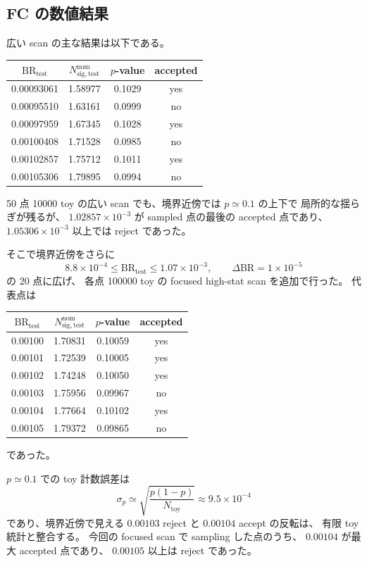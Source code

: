 \documentclass[a4paper,11pt]{jsarticle}
\begin{document}
\subsection{FC の数値結果}
広い scan の主な結果は以下である。

\begin{center}
\begin{tabular}{cccc}
\toprule
\(\mathrm{BR}_{\mathrm{test}}\) & \(N_{\mathrm{sig,test}}^{\mathrm{nom}}\) & \(p\)-value & accepted \\
\midrule
0.00093061 & 1.58977 & 0.1029 & yes \\
0.00095510 & 1.63161 & 0.0999 & no \\
0.00097959 & 1.67345 & 0.1028 & yes \\
0.00100408 & 1.71528 & 0.0985 & no \\
0.00102857 & 1.75712 & 0.1011 & yes \\
0.00105306 & 1.79895 & 0.0994 & no \\
\bottomrule
\end{tabular}
\end{center}

50 点 10000 toy の広い scan でも、境界近傍では \(p\simeq 0.1\) の上下で
局所的な揺らぎが残るが、
\(1.02857\times10^{-3}\) が sampled 点の最後の accepted 点であり、
\(1.05306\times10^{-3}\) 以上では reject であった。

そこで境界近傍をさらに
\[
8.8\times10^{-4}\le \mathrm{BR}_{\mathrm{test}} \le 1.07\times10^{-3},
\qquad
\Delta \mathrm{BR}=1\times10^{-5}
\]
の 20 点に広げ、
各点 100000 toy の focused high-stat scan を追加で行った。
代表点は
\begin{center}
\begin{tabular}{cccc}
\toprule
\(\mathrm{BR}_{\mathrm{test}}\) & \(N_{\mathrm{sig,test}}^{\mathrm{nom}}\) & \(p\)-value & accepted \\
\midrule
0.00100 & 1.70831 & 0.10059 & yes \\
0.00101 & 1.72539 & 0.10005 & yes \\
0.00102 & 1.74248 & 0.10050 & yes \\
0.00103 & 1.75956 & 0.09967 & no \\
0.00104 & 1.77664 & 0.10102 & yes \\
0.00105 & 1.79372 & 0.09865 & no \\
\bottomrule
\end{tabular}
\end{center}
であった。

\(p\simeq 0.1\) での toy 計数誤差は
\[
\sigma_p \simeq \sqrt{\frac{p(1-p)}{N_{\mathrm{toy}}}}
\approx 9.5\times10^{-4}
\]
であり、境界近傍で見える
\(0.00103\) reject と \(0.00104\) accept の反転は、
有限 toy 統計と整合する。
今回の focused scan で sampling した点のうち、
\(0.00104\) が最大 accepted 点であり、
\(0.00105\) 以上は reject であった。
\end{document}
